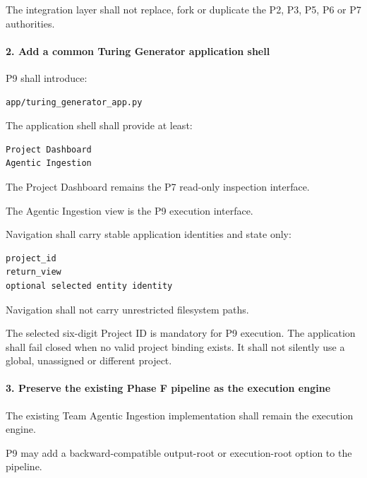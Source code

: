 The integration layer shall not replace, fork or duplicate the P2, P3, P5, P6 or P7 authorities.

\hypertarget{2-add-a-common-turing-generator-application-shell}{%
\paragraph{2. Add a common Turing Generator application shell}\label{2-add-a-common-turing-generator-application-shell}}

P9 shall introduce:

\begin{verbatim}
app/turing_generator_app.py
\end{verbatim}

The application shell shall provide at least:

\begin{verbatim}
Project Dashboard
Agentic Ingestion
\end{verbatim}

The Project Dashboard remains the P7 read-only inspection interface.

The Agentic Ingestion view is the P9 execution interface.

Navigation shall carry stable application identities and state only:

\begin{verbatim}
project_id
return_view
optional selected entity identity
\end{verbatim}

Navigation shall not carry unrestricted filesystem paths.

The selected six-digit Project ID is mandatory for P9 execution. The application shall fail closed when no valid project binding exists. It shall not silently use a global, unassigned or different project.

\hypertarget{3-preserve-the-existing-phase-f-pipeline-as-the-execution-engine}{%
\paragraph{3. Preserve the existing Phase F pipeline as the execution engine}\label{3-preserve-the-existing-phase-f-pipeline-as-the-execution-engine}}

The existing Team Agentic Ingestion implementation shall remain the execution engine.

P9 may add a backward-compatible output-root or execution-root option to the pipeline.

